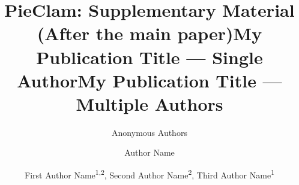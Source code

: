 \documentclass[letterpaper]{article} %
\title{PieClam: Supplementary Material (After the main paper)}
\author{
    Anonymous Authors
}
\title{My Publication Title --- Single Author}
\author {
    Author Name
}
\title{My Publication Title --- Multiple Authors}
\author {
    First Author Name\textsuperscript{\rm 1,\rm 2},
    Second Author Name\textsuperscript{\rm 2},
    Third Author Name\textsuperscript{\rm 1}
}
\begin{document}
\maketitle

\begin{abstract}







\end{abstract}
\end{document}
